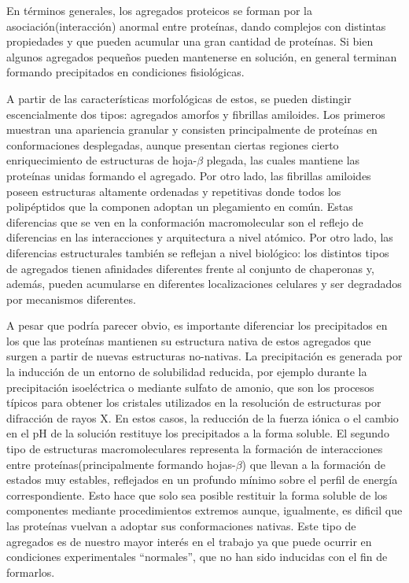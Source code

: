 En términos generales, los agregados proteicos se forman por la asociación(interacción) anormal entre proteínas, dando complejos con distintas propiedades y que pueden acumular una gran cantidad de proteínas.
Si bien algunos agregados pequeños pueden mantenerse en solución, en general terminan formando precipitados en condiciones fisiológicas. 

A partir de las características morfológicas de estos, se pueden distingir escencialmente dos tipos: agregados amorfos y fibrillas amiloides.
Los primeros muestran una apariencia granular y consisten principalmente de proteínas en conformaciones desplegadas, aunque presentan ciertas regiones cierto enriquecimiento de estructuras de hoja-$\beta$ plegada, las cuales
mantiene las proteínas unidas formando el agregado.
Por otro lado, las fibrillas amiloides poseen estructuras altamente ordenadas y repetitivas donde todos los polipéptidos que la componen adoptan un plegamiento en común.
Estas diferencias que se ven en la conformación macromolecular son el reflejo de diferencias en las interacciones y arquitectura a nivel atómico.
Por otro lado, las diferencias estructurales también se reflejan a nivel biológico: los distintos tipos de agregados tienen afinidades diferentes frente al conjunto de chaperonas y, además, 
pueden acumularse en diferentes localizaciones celulares y ser degradados por mecanismos diferentes.

A pesar que podría parecer obvio, es importante diferenciar los precipitados en los que las proteínas mantienen su estructura nativa de estos agregados que surgen a partir de nuevas estructuras no-nativas.
La precipitación es generada por la inducción de un entorno de solubilidad reducida, por ejemplo durante la precipitación isoeléctrica o mediante sulfato de amonio,
que son los procesos típicos para obtener los cristales utilizados en la resolución de estructuras por difracción de rayos X. 
En estos casos, la reducción de la fuerza iónica o el cambio en el pH de la solución restituye los precipitados a la forma soluble.
El segundo tipo de estructuras macromoleculares representa la formación de interacciones entre proteínas(principalmente formando hojas-$\beta$) que llevan a la formación de estados muy estables, 
reflejados en un profundo mínimo sobre el perfil de energía correspondiente. 
Esto hace que solo sea posible restituir la forma soluble de los componentes mediante procedimientos extremos aunque, igualmente, es dificil que las proteínas vuelvan a adoptar sus conformaciones nativas.
Este tipo de agregados es de nuestro mayor interés en el trabajo ya que puede ocurrir en condiciones experimentales ``normales'', que no han sido inducidas con el fin de formarlos.


